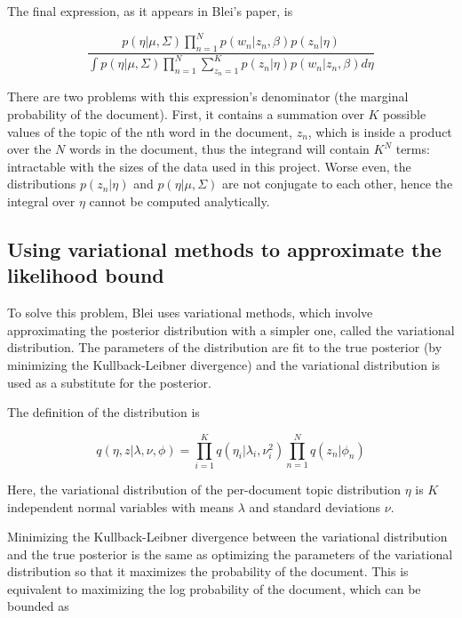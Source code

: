 \documentclass[12pt,a4paper,twoside,openright]{report}
\begin{document}
The final expression, as it appears in Blei's paper, is

\begin{equation}
\frac{p(\eta | \mu, \Sigma) \prod\limits_{n=1}^N p(w_n | z_n, \beta) p(z_n | \eta)}{\int p(\eta | \mu, \Sigma)  \prod\limits_{n=1}^N \sum\limits_{z_n=1}^K p(z_n | \eta) p(w_n | z_n, \beta) d\eta}
\end{equation}

There are two problems with this expression's denominator (the marginal probability of the document). First, it contains a summation over $K$ possible values of the topic of the nth word in the document, $z_n$, which is inside a product over the $N$ words in the document, thus the integrand will contain $K^N$ terms: intractable with the sizes of the data used in this project. Worse even, the distributions $p(z_n | \eta)$ and $p(\eta | \mu, \Sigma)$ are not conjugate to each other, hence the integral over $\eta$ cannot be computed analytically.

\subsection{Using variational methods to approximate the likelihood bound}

To solve this problem, Blei uses variational methods, which involve approximating the posterior distribution with a simpler one, called the variational distribution. The parameters of the distribution are fit to the true posterior (by minimizing the Kullback-Leibner divergence) and the variational distribution is used as a substitute for the posterior.

The definition of the distribution is

\begin{equation}
q(\eta, z | \lambda, \nu, \phi) = \prod\limits_{i=1}^K q(\eta_i|\lambda_i, \nu_i^2) \prod\limits_{n=1}^N q(z_n | \phi_n)
\end{equation}

Here, the variational distribution of the per-document topic distribution $\eta$ is $K$ independent normal variables with means $\lambda$ and standard deviations $\nu$.

Minimizing the Kullback-Leibner divergence between the variational distribution and the true posterior is the same as optimizing the parameters of the variational distribution so that it maximizes the probability of the document. This is equivalent to maximizing the log probability of the document, which can be bounded as
\end{document}
